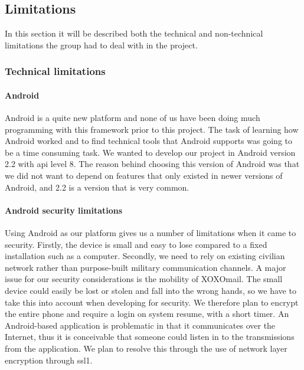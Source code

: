 \subsection{Limitations}

In this section it will be described both the technical and non-technical limitations the group had to deal with in the project.

\subsubsection{Technical limitations}

\paragraph{Android}\hfill
\newline
Android is a quite new platform and none of us have been doing much programming with this framework prior to this project. The task of learning how Android worked and to find technical tools that Android supports was going to be a time consuming task. We wanted to develop our project in Android version 2.2 with \gls{api} level 8. The reason behind choosing this version of Android was that we did not want to depend on features that only existed in newer versions of Android, and 2.2 is a version that is very common.

\newpage

\paragraph{Android security limitations}\hfill
\newline
Using Android as our platform gives us a number of limitations when it came to security. Firstly, the device is small and easy to lose compared to a fixed installation such as a computer. Secondly, we need to rely on existing civilian network rather than purpose-built military communication channels.
\newline
\newline
A major issue for our security considerations is the mobility of XOXOmail. The small device could easily be lost or stolen and fall into the wrong hands, so we have to take this into account when developing for security. We therefore plan to encrypt the entire phone and require a login on system resume, with a short timer.
\newline
\newline
An Android-based application is problematic in that it communicates over the Internet, thus it is conceivable that someone could listen in to the transmissions from the application. We plan to resolve this through the use of network layer encryption through \gls{ssl1}. 

